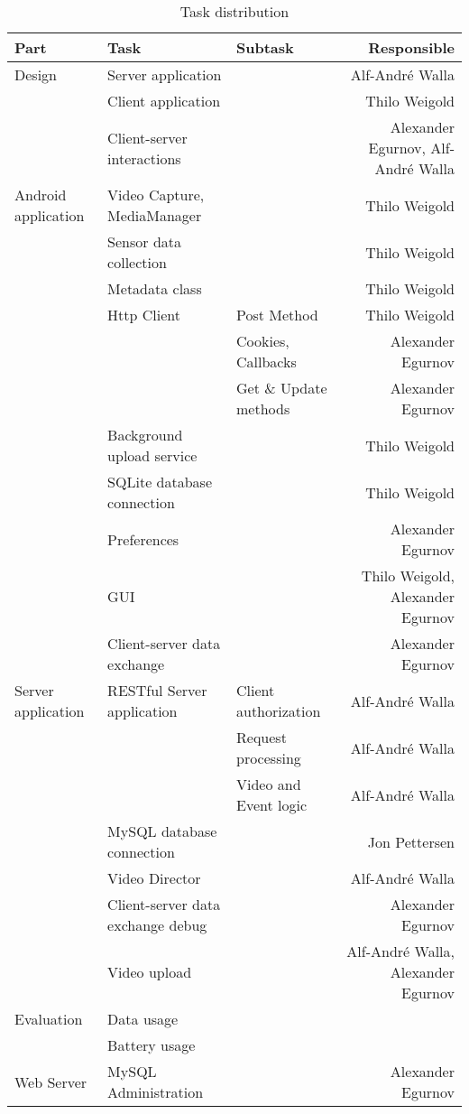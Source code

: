 \documentclass[conference]{IEEEtran}
\begin{document}
\begin{table*}[t]
	\centering
	\renewcommand{\arraystretch}{1.5}
	\caption{Task distribution}
	\label{tab:task_distr}
	\begin{tabular}{lllr}
		\toprule
		Part & Task & Subtask & Responsible \\
		\midrule
		Design
			& Server application & & Alf-André Walla \\
			& Client application & & Thilo Weigold \\
			& Client-server interactions & & Alexander Egurnov, Alf-André Walla \\
		\midrule
		Android application
			& Video Capture, MediaManager & & Thilo Weigold \\
			& Sensor data collection &  & Thilo Weigold \\
			& Metadata class & & Thilo Weigold \\
			& Http Client & Post Method & Thilo Weigold \\
			&       & Cookies, Callbacks & Alexander Egurnov \\
			&       & Get \& Update methods & Alexander Egurnov \\
			& Background upload service  & & Thilo Weigold \\
			& SQLite database connection & & Thilo Weigold \\
			& Preferences & & Alexander Egurnov \\
			& GUI & & Thilo Weigold, Alexander Egurnov \\
			& Client-server data exchange & & Alexander Egurnov \\
		\midrule
		Server application 
			& RESTful Server application & Client authorization & Alf-André Walla \\
			&       & Request processing & Alf-André Walla \\
			&       & Video and Event logic & Alf-André Walla \\
			& MySQL database connection & & Jon Pettersen \\
			& Video Director  & & Alf-André Walla \\
			& Client-server data exchange debug & & Alexander Egurnov \\
			& Video upload & & Alf-André Walla, Alexander Egurnov \\
		\midrule
		Evaluation
			& Data usage & & \\
			& Battery usage & & \\
		\midrule
		Web Server
			& MySQL Administration & & Alexander Egurnov \\

\end{tabular}
\end{table*}
\end{document}

